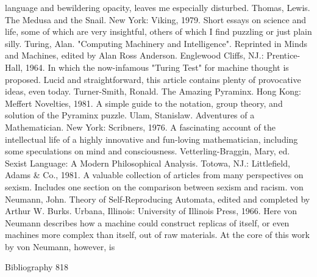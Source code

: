   language and bewildering opacity, leaves me especially disturbed.
Thomas, Lewis. The Medusa and the Snail. New York: Viking, 1979. Short essays on science
  and life, some of which are very insightful, others of which I find puzzling or just plain
  silly.
Turing, Alan. "Computing Machinery and Intelligence". Reprinted in Minds and Machines,
  edited by Alan Ross Anderson. Englewood Cliffs, NJ.: Prentice-Hall,
1964. In which the now-infamous "Turing Test" for machine thought is proposed. Lucid and
  straightforward, this article contains plenty of provocative ideas, even today.
Turner-Smith, Ronald. The Amazing Pyraminx. Hong Kong: Meffert Novelties, 1981. A
  simple guide to the notation, group theory, and solution of the Pyraminx puzzle.
Ulam, Stanislaw. Adventures of a Mathematician. New York: Scribners, 1976. A fascinating
  account of the intellectual life of a highly innovative and fun-loving mathematician,
  including some speculations on mind and consciousness.
Vetterling-Braggin, Mary, ed. Sexist Language: A Modern Philosophical Analysis. Totowa,
  NJ.: Littlefield, Adams \& Co., 1981. A valuable collection of articles from many
  perspectives on sexism. Includes one section on the comparison between sexism and
  racism.
von Neumann, John. Theory of Self-Reproducing Automata, edited and completed by
  Arthur W. Burks. Urbana, Illinois: University of Illinois Press, 1966. Here von Neumann
  describes how a machine could construct replicas of itself, or even machines more complex
  than itself, out of raw materials. At the core of this work by von Neumann, however, is


Bibliography                                                                                    818

